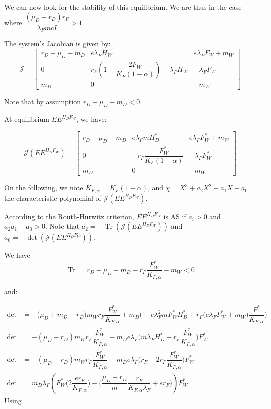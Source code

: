 \documentclass{article}
\newcommand{\lfw}{\lambda_{F}}
\newcommand{\lfw}{\lambda_{F}}
\DeclareMathOperator{\Tr}{Tr}
\begin{document}
We can now look for the stability of this equilibrium. We are thus in the case where $\dfrac{(\mu_D - r_D) r_F}{\lfw m cI} > 1$

The system's Jacobian is given by:
\begin{equation*}
\mathcal{J} = \begin{bmatrix}
r_D-\mu_D - m_D & e \lfw H_W & e\lfw F_W + m_W \\
0 & r_F \left( 1 - \dfrac{2F_W}{K_F(1-\alpha)} \right) - \lfw H_W & - \lfw F_W \\
m_D & 0 & -m_W
\end{bmatrix}
\end{equation*}

Note that by assumption $r_D-\mu_D - m_D < 0$.

At equilibrium $EE^{H_D F_W}$, we have:

\begin{equation*}
\mathcal{J}(EE^{H_D F_W}) = \begin{bmatrix}
r_D -\mu_D - m_D & e \lfw m H_D^* & e \lfw F^*_W +m_W \\
0 & -r_F \dfrac{F_W^*}{K_F(1-\alpha)} & - \lfw F_W^* \\
m_D & 0 & -m_W
\end{bmatrix}
\end{equation*}

On the following, we note $K_{F, \alpha} = K_F(1-\alpha)$, and $\chi = X^3 + a_2 X^2 + a_1 X + a_0$ the characteristic polynomial of $\mathcal{J}(EE^{H_D F_W})$. 

According to the Routh-Hurwitz  criterion, $EE^{H_D F_W}$ is AS if $a_i > 0$ and $a_2 a_1 - a_0 > 0$. Note that $a_2 = - \Tr(\mathcal{J}(EE^{H_D F_W}))$ and $a_0 = - \det (\mathcal{J}(EE^{H_D F_W}))$.

We have
\begin{equation*}
\Tr = r_D - \mu_D - m_D - r_F \dfrac{F_W^*}{K_{F, \alpha}} - m_W < 0
\end{equation*}

and:

\begin{align*}
\det &= -\Big(\mu_D + m_D -r_D \Big) m_W r_F \dfrac{F^*_W}{K_{F, \alpha}} + m_D\Big(-e\lfw ^2 m F_W^* H_D^* + r_F \big(e \lfw F^*_W + m_W \big) \dfrac{F^*}{K_{F, \alpha}} \Big) \\
\det &= - (\mu_D-r_D) m_W r_F \dfrac{F^*_W}{K_{F, \alpha}} - m_D e \lfw \Big( m \lfw H_D^* - r_F \dfrac{F^*_W}{K_{F, \alpha}} \Big) F^*_W \\
\det &= - (\mu_D-r_D) m_W r_F \dfrac{F^*_W}{K_{F, \alpha}} - m_D e \lfw \Big( r_F - 2 r_F \dfrac{F^*_W}{K_{F, \alpha}} \Big) F^*_W \\
\det &= m_D \lfw \left( F_W^* \Big(2 \dfrac{e r_F}{K_{F, \alpha}} \Big) - \Big(\dfrac{\mu_D - r_D}{m} \dfrac{r_F}{K_{F, \alpha} \lfw} + er_F \Big) \right) F_W^* 
\end{align*}
Using 
\end{document}
